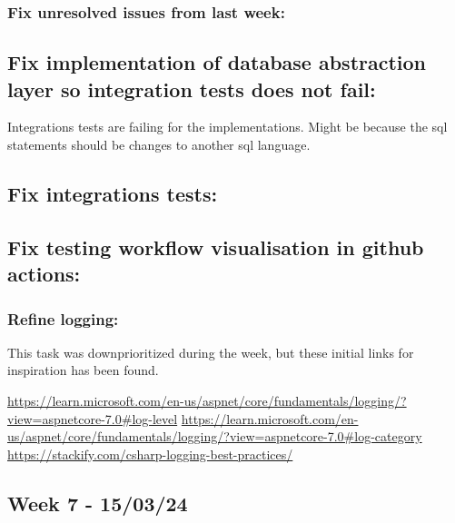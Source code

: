 
\subsubsection{Fix unresolved issues from last week:}
\label{log:fix-unresolved-issues-from-last-week}

\subsection{Fix implementation of database abstraction layer so integration tests does not fail:}
\label{log:fix-implementation-of-database-abstraction-layer-so-integration-tests-does-not-fail}

Integrations tests are failing for the implementations. Might be because
the sql statements should be changes to another sql language.

\subsection{Fix integrations tests:}
\label{log:fix-integrations-tests}

\subsection{Fix testing workflow visualisation in github actions:}
\label{log:fix-testing-workflow-visualisation-in-github-actions}

\subsubsection{Refine logging:}
\label{log:refine-logging}

This task was downprioritized during the week, but these initial links
for inspiration has been found.

\url{https://learn.microsoft.com/en-us/aspnet/core/fundamentals/logging/?view=aspnetcore-7.0\#log-level}
\url{https://learn.microsoft.com/en-us/aspnet/core/fundamentals/logging/?view=aspnetcore-7.0\#log-category}
\url{https://stackify.com/csharp-logging-best-practices/}

\subsection{Week 7 - 15/03/24}
\label{log:week7}

